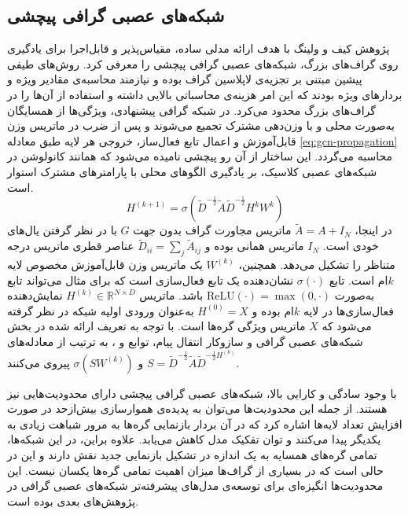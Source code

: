 \subsection{شبکه‌های عصبی گرافی پیچشی}
پژوهش کیف و ولینگ \cite{kipf2016semi} با هدف ارائه مدلی ساده، مقیاس‌پذیر و قابل‌اجرا برای یادگیری روی گراف‌های بزرگ، شبکه‌های عصبی گرافی پیچشی را معرفی کرد. روش‌های طیفی پیشین مبتنی بر تجزیه‌ی لاپلاسین گراف بوده و نیازمند محاسبه‌ی مقادیر ویژه و بردارهای ویژه‌ بودند که این امر هزینه‌ی محاسباتی بالایی داشته و استفاده از آن‌ها را در گراف‌های بزرگ محدود می‌کرد. در شبکه گرافی پیشنهادی، ویژگی‌ها از همسایگان به‌صورت محلی و با وزن‌دهی مشترک تجمیع می‌شوند و پس از ضرب در ماتریس وزن قابل‌آموزش و اعمال تابع فعال‌ساز، خروجی هر لایه طبق معادله \ref{eq:gcn-propagation} محاسبه می‌گردد. این ساختار از آن رو پیچشی نامیده می‌شود که همانند کانولوشن در شبکه‌های عصبی کلاسیک، بر یادگیری الگوهای محلی با پارامترهای مشترک استوار است.
\begin{equation}
	H^{(k+1)} = \sigma(\tilde{D}^{-\frac{1}{2}} \tilde{A} \tilde{D}^{-\frac{1}{2}}H^{k}W^{k})
	\label{eq:gcn-propagation}
\end{equation}
در اینجا، $\tilde{A} = A + I_N$ ماتریس مجاورت گراف بدون‌ جهت $G$ با در نظر گرفتن یال‌های خودی است. 
$I_N$ ماتریس همانی بوده و $\tilde{D}_{ii} = \sum_j \tilde{A}_{ij}$ عناصر قطری ماتریس درجه متناظر را تشکیل می‌دهد. 
همچنین، $W^{(k)}$ یک ماتریس وزن قابل‌آموزش مخصوص لایه $k$ام است. 
تابع $\sigma(\cdot)$ نشان‌دهنده یک تابع فعال‌سازی است که برای مثال می‌تواند تابع  به‌صورت 
$\mathrm{ReLU}(\cdot) = \max(0,\cdot)$ باشد. 
ماتریس $H^{(k)} \in \mathbb{R}^{N \times D}$ نمایش‌دهنده فعال‌سازی‌ها در لایه $k$ام بوده و 
$H^{(0)} = X$ به‌عنوان ورودی اولیه شبکه در نظر گرفته می‌شود که $X$ ماتریس ویژگی گره‌ها است.
با توجه به تعریف ارائه شده در بخش شبکه‌های عصبی گرافی و سازوکار انتقال پیام، توابع  و ، به ترتیب از معادله‌های
$S=\tilde{D}^{-\frac{1}{2}} \tilde{A} \tilde{D}^{-\frac{1}{2} H^{(k)}}$
و 
$\sigma(SW^{(k)})$
 پیروی می‌کنند.
 
 با وجود سادگی و کارایی بالا، شبکه‌های عصبی گرافی پیچشی دارای محدودیت‌هایی نیز هستند. از جمله این محدودیت‌ها می‌توان به پدیده‌ی هموارسازی بیش‌ازحد در صورت افزایش تعداد لایه‌ها اشاره کرد که در آن بردار بازنمایی گره‌ها به مرور شباهت زیادی به یکدیگر پیدا می‌کنند و توان تفکیک مدل کاهش می‌یابد. علاوه بر‌این، در این شبکه‌ها، تمامی گره‌های همسایه به یک اندازه در تشکیل بازنمایی جدید نقش دارند و این در حالی است که در بسیاری از گراف‌ها میزان اهمیت تمامی گره‌ها یکسان نیست. این محدودیت‌ها انگیزه‌ای برای توسعه‌ی مدل‌های پیشرفته‌تر شبکه‌های عصبی گرافی در پژوهش‌های بعدی بوده است.  

